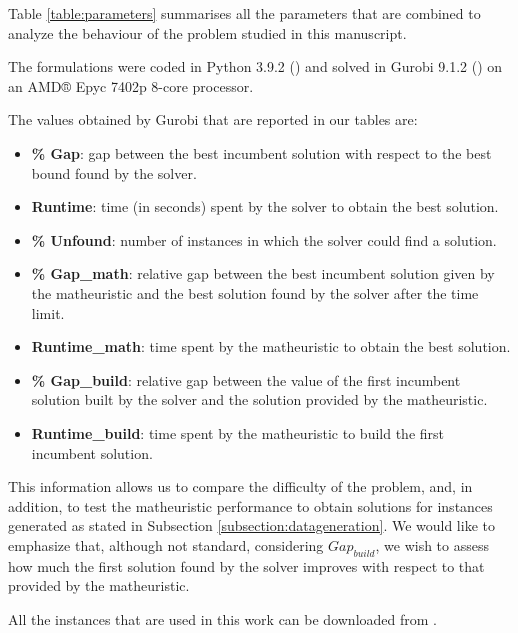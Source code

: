 \documentclass[a4paper,  review, authoryear, 1p.]{elsarticle}
\begin{document}
		Table \ref{table:parameters} summarises all the parameters that are combined to analyze the behaviour of the problem studied in this manuscript.
		
		

		The formulations were coded in Python 3.9.2 (\citet{g.vanrossumguido1995}) and solved in Gurobi 9.1.2 (\citet{gurobioptimizationllc2022a}) on an AMD® Epyc 7402p 8-core processor. 
		
		The values obtained by Gurobi that are reported in our tables are:
		\begin{itemize}
			\item \textbf{\% Gap}: gap between the best incumbent solution with respect to the best bound found by the solver.
			\item \textbf{Runtime}: time (in seconds) spent by the solver to obtain the best solution.
			\item \textbf{\% Unfound}: number of instances in which the solver could find a solution.
			\item \textbf{\% Gap\_{math}}: relative gap between the best incumbent solution given by the matheuristic and the best solution found by the solver after the time limit.
			\item \textbf{Runtime\_{math}}: time spent by the matheuristic to obtain the best solution.
			\item \textbf{\% Gap\_{build}}: relative gap between the value of the first incumbent solution built by the solver and the solution provided by the matheuristic.
			\item \textbf{Runtime\_{build}}: time spent by the matheuristic to build the first incumbent solution.
		\end{itemize}
		
		This information allows us to compare the difficulty of the problem, and, in addition, to test the matheuristic performance to obtain solutions for instances generated as stated in Subsection \ref{subsection:datageneration}. We would like to emphasize that, although not standard,  considering $Gap_{build}$, we wish to assess  how much the first solution found by the solver improves with respect to that provided by the matheuristic.
		
		All the instances that are used in this work can be downloaded from \cite{valverde2023}.
			 
\end{document}
